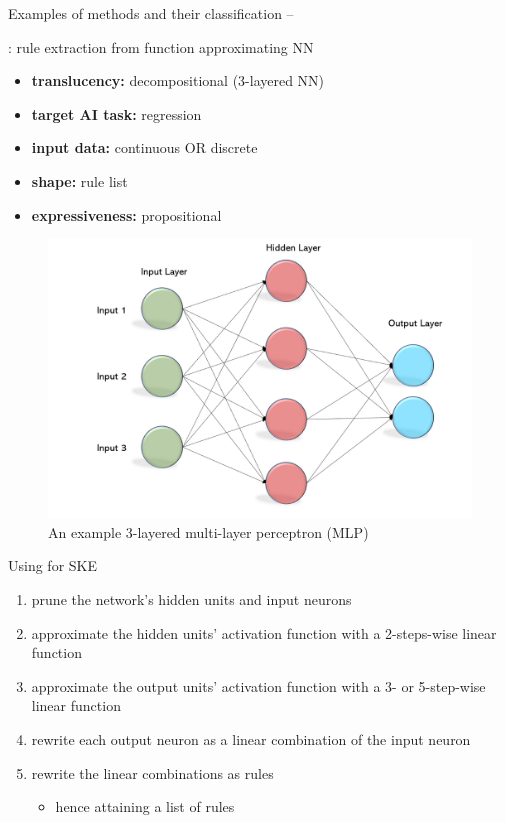 \documentclass[presentation]{beamer}\mode<presentation>{\usetheme{AMSBolognaFC}}
\begin{document}
\begin{frame}[allowframebreaks]{Examples of methods and their classification -- }

    \begin{block}{\textbf{}: rule extraction from function approximating NN}
        \begin{itemize}
            \item \textbf{translucency:} decompositional (3-layered NN)
            \item \textbf{target AI task:} regression
            \item \textbf{input data:} continuous OR discrete
            \item \textbf{shape:} rule list
            \item \textbf{expressiveness:} propositional
        \end{itemize}
    \end{block}

    \framebreak

    \begin{figure}
        \centering
        \includegraphics[width=.6\linewidth]{figures/3mlp.png}
        \caption{An example 3-layered multi-layer perceptron (MLP)}
        \label{fig:3mlp-example}
    \end{figure}

    \framebreak

    \begin{exampleblock}{Using  for SKE}
        \begin{enumerate}
            \item \alert{prune} the network's hidden units and input neurons
            \item approximate the hidden units' activation function with a \alert{2-steps-wise} linear function
            \item approximate the output units' activation function with a \alert{3- or 5-step-wise} linear function
            \item rewrite each output neuron as a \alert{linear combination} of the input neuron
            \item rewrite the linear combinations as rules
            \begin{itemize}
                \item hence attaining a \alert{list of rules}
            \end{itemize}
        \end{enumerate}
    \end{exampleblock}


\end{frame}
\end{document}
